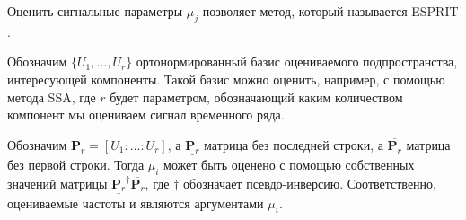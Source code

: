 \documentclass[%
12pt,
master,  %
natbib,      %
subf,        %
substylefile = spbu.rtx,
href,        %
colorlinks,  %
]{disser}
\begin{document}
Оценить сигнальные параметры $\mu_j$ позволяет метод, который называется ESPRIT \cite{esprit}.


Обозначим $\{U_1, \dots, U_r \}$ ортонормированный базис оцениваемого подпространства, интересующей компоненты. Такой базис можно оценить, например, с помощью метода SSA, где $r$ будет параметром, обозначающий каким количеством компонент мы оцениваем сигнал временного ряда.


 Обозначим $\textbf{P}_r = [U_1 : \dots : U_r ]$, а $\underline{\textbf{P}_r}$ матрица без последней строки, а $\overline{\textbf{P}_r}$  матрица без первой строки. Тогда $\mu_i$ может быть оценено с помощью собственных значений матрицы $\underline{\textbf{P}_r}^{\dagger}\overline{\textbf{P}_r}$, где $\dagger$ обозначает псевдо-инверсию. Соответственно, оцениваемые частоты и являются аргументами $\mu_i$.
\end{document}
